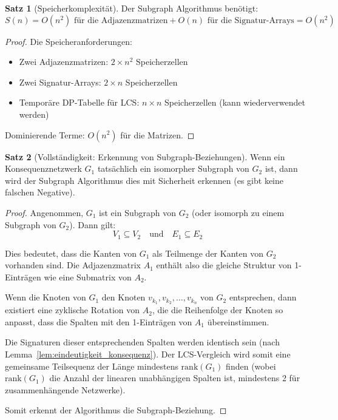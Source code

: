\documentclass[a4paper,12pt]{article}
\theoremstyle{definition}
\newtheorem{satz}{Satz}
\begin{document}
\begin{satz}[Speicherkomplexität]
Der Subgraph Algorithmus benötigt:
\[
S(n) = O(n^2) \text{ für die Adjazenzmatrizen} + O(n) \text{ für die Signatur-Arrays} = O(n^2)
\]
\end{satz}

\begin{proof}
Die Speicheranforderungen:
\begin{itemize}
    \item Zwei Adjazenzmatrizen: $2 \times n^2$ Speicherzellen
    \item Zwei Signatur-Arrays: $2 \times n$ Speicherzellen
    \item Temporäre DP-Tabelle für LCS: $n \times n$ Speicherzellen (kann wiederverwendet werden)
\end{itemize}

Dominierende Terme: $O(n^2)$ für die Matrizen.
\end{proof}

\begin{satz}[Vollständigkeit: Erkennung von Subgraph-Beziehungen]
\label{satz:vollstaendigkeit}
Wenn ein Konsequenznetzwerk $G_1$ tatsächlich ein isomorpher Subgraph von $G_2$ ist, dann wird der Subgraph Algorithmus dies mit Sicherheit erkennen (es gibt keine falschen Negative).
\end{satz}

\begin{proof}
Angenommen, $G_1$ ist ein Subgraph von $G_2$ (oder isomorph zu einem Subgraph von $G_2$). Dann gilt:
\[
V_1 \subseteq V_2 \quad \text{und} \quad E_1 \subseteq E_2
\]

Dies bedeutet, dass die Kanten von $G_1$ als Teilmenge der Kanten von $G_2$ vorhanden sind. Die Adjazenzmatrix $A_1$ enthält also die gleiche Struktur von 1-Einträgen wie eine Submatrix von $A_2$.

Wenn die Knoten von $G_1$ den Knoten $v_{k_1}, v_{k_2}, \ldots, v_{k_n}$ von $G_2$ entsprechen, dann existiert eine zyklische Rotation von $A_2$, die die Reihenfolge der Knoten so anpasst, dass die Spalten mit den 1-Einträgen von $A_1$ übereinstimmen.

Die Signaturen dieser entsprechenden Spalten werden identisch sein (nach Lemma~\ref{lem:eindeutigkeit_konsequenz}). Der LCS-Vergleich wird somit eine gemeinsame Teilsequenz der Länge mindestens $\text{rank}(G_1)$ finden (wobei $\text{rank}(G_1)$ die Anzahl der linearen unabhängigen Spalten ist, mindestens 2 für zusammenhängende Netzwerke).

Somit erkennt der Algorithmus die Subgraph-Beziehung.
\end{proof}
\end{document}
